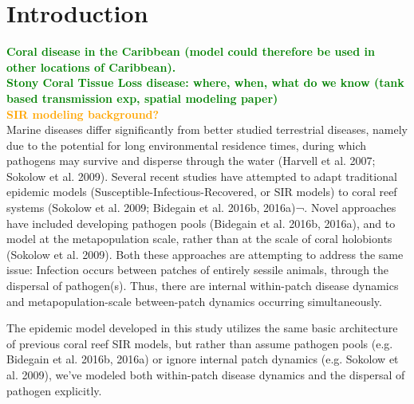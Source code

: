 \documentclass[utf8]{frontiersSCNS}
\newcommand{\erinn}[1]{\textbf{\textcolor{green}{#1}}}
\newcommand{\dan}[1]{\textbf{\textcolor{orange}{#1}}}
\begin{document}
\section{Introduction}
\erinn{Coral disease in the Caribbean (model could therefore be used in other locations of Caribbean). \\Stony Coral Tissue Loss disease: where, when, what do we know (tank based transmission exp, spatial modeling paper)} \\
\dan{SIR modeling background?} \\ Marine diseases differ significantly from better studied terrestrial diseases, namely due to the potential for long environmental residence times, during which pathogens may survive and disperse through the water (Harvell et al. 2007; Sokolow et al. 2009). Several recent studies have attempted to adapt traditional epidemic models (Susceptible-Infectious-Recovered, or SIR models) to coral reef systems (Sokolow et al. 2009; Bidegain et al. 2016b, 2016a)¬. Novel approaches have included developing pathogen pools (Bidegain et al. 2016b, 2016a), and to model at the metapopulation scale, rather than at the scale of coral holobionts (Sokolow et al. 2009). Both these approaches are attempting to address the same issue: Infection occurs between patches of entirely sessile animals, through the dispersal of pathogen(s). Thus, there are internal within-patch disease dynamics and metapopulation-scale between-patch dynamics occurring simultaneously.

The epidemic model developed in this study utilizes the same basic architecture of previous coral reef SIR models, but rather than assume pathogen pools (e.g. Bidegain et al. 2016b, 2016a) or ignore internal patch dynamics (e.g. Sokolow et al. 2009), we've modeled both within-patch disease dynamics and the dispersal of pathogen explicitly. \\
\end{document}
